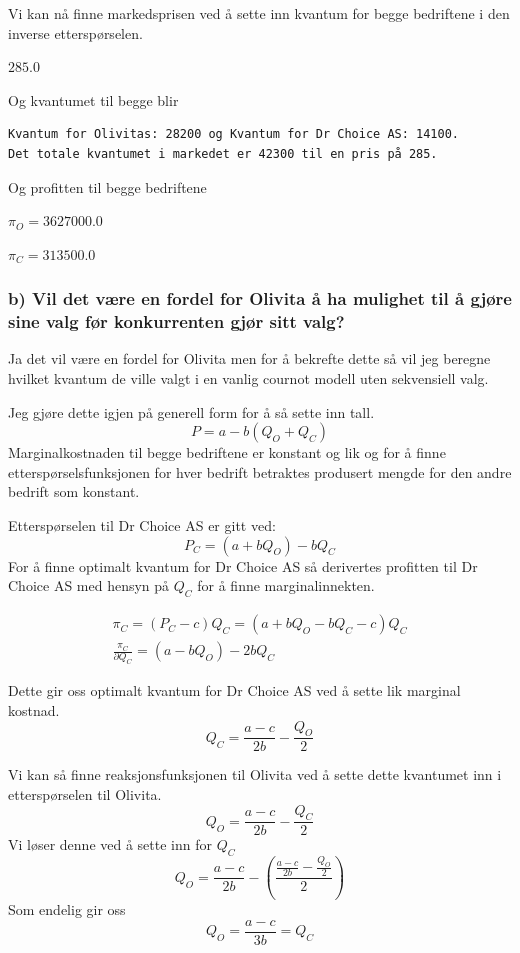 \documentclass[
  12pt,
  a4paper,
  DIV=11,
  numbers=noendperiod]{scrartcl}
\begin{document}
Vi kan nå finne markedsprisen ved å sette inn kvantum for begge
bedriftene i den inverse etterspørselen.

$\displaystyle 285.0$

Og kvantumet til begge blir

\begin{verbatim}
Kvantum for Olivitas: 28200 og Kvantum for Dr Choice AS: 14100. 
Det totale kvantumet i markedet er 42300 til en pris på 285.
\end{verbatim}

Og profitten til begge bedriftene

$\displaystyle π_{O} = 3627000.0$

$\displaystyle π_{C} = 313500.0$

\newpage

\subsubsection{b) Vil det være en fordel for Olivita å ha mulighet til å
gjøre sine valg før konkurrenten gjør sitt
valg?}\label{b-vil-det-vuxe6re-en-fordel-for-olivita-uxe5-ha-mulighet-til-uxe5-gjuxf8re-sine-valg-fuxf8r-konkurrenten-gjuxf8r-sitt-valg}

Ja det vil være en fordel for Olivita men for å bekrefte dette så vil
jeg beregne hvilket kvantum de ville valgt i en vanlig cournot modell
uten sekvensiell valg.

Jeg gjøre dette igjen på generell form for å så sette inn tall. \[
P = a - b(Q_O + Q_C)
\] Marginalkostnaden til begge bedriftene er konstant og lik og for å
finne etterspørselsfunksjonen for hver bedrift betraktes produsert
mengde for den andre bedrift som konstant.

Etterspørselen til Dr Choice AS er gitt ved: \[
P_C = (a  + bQ_O)-bQ_C
\] For å finne optimalt kvantum for Dr Choice AS så derivertes profitten
til Dr Choice AS med hensyn på \(Q_C\) for å finne marginalinnekten.

\begin{align*}
\pi_C = (P_C - c)Q_C = (a  + bQ_O - bQ_C - c)Q_C \\
\frac{\pi_C}{\partial Q_C} = (a - bQ_O) - 2bQ_C
\end{align*}

Dette gir oss optimalt kvantum for Dr Choice AS ved å sette lik marginal
kostnad. \[
Q_C = \frac{a - c}{2b} - \frac{Q_O}{2}
\]

Vi kan så finne reaksjonsfunksjonen til Olivita ved å sette dette
kvantumet inn i etterspørselen til Olivita. \[
Q_O = \frac{a - c}{2b} - \frac{Q_C}{2}
\] Vi løser denne ved å sette inn for \(Q_C\) \[
Q_O = \frac{a - c}{2b} - \left(\frac{\frac{a - c}{2b} - \frac{Q_O}{2}}{2}\right)
\] Som endelig gir oss \[
Q_O = \frac{a - c}{3b} = Q_C
\]
\end{document}
